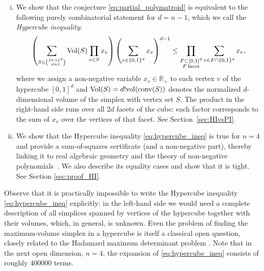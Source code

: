\documentclass[11pt]{amsart}
\newcommand{\KSays}[1] {\textcolor{brilliantrose}{\bfseries #1 } \normalfont}
\newcommand{\conv}{\mathrm{conv}}
\def\vol{{\rm vol}}
\def\Vol{{\rm Vol}}
\theoremstyle{definition}
\theoremstyle{remark}
\begin{document}
\begin{enumerate}[(i)]
   
	\item 
    We show that the conjecture \eqref{eq:partial_polymatroid} is equivalent to the following purely combinatorial statement for $d = n-1$, which we call the \emph{Hypercube inequality}:
\begin{equation}\label{eq:hypercube_ineq}
	\left( 
        \sum_{S \in \binom{\{0,1\}^d}{d+1}} 
            \Vol(S)\prod_{v \in S} x_v
            \right)
        \left( 
        \sum_{v \in \{0,1\}^d} x_v 
    \right)^{d-1}  
    \le 
    \prod_{\substack{F\subset [0,1]^d\\ F\, \text{facet}}} 
    \sum_{v \in F \cap \{0,1\}^d} 
        x_v,
\end{equation}
where we assign a non‑negative variable $x_v \in \mathbb{R}_+$ to each vertex $v$ of
the hypercube $[0,1]^d$ and $\Vol(S)=d!\vol(\conv(S))$ denotes the normalized $d$-dimensional volume of the simplex with vertex set $S$. The product in the right-hand side runs over all $2d$ facets of the cube: each factor corresponds to the sum of $x_v$ over the vertices of that facet. See Section~\ref{sec:HIvsPI}. 

    \item We show that the Hypercube inequality \eqref{eq:hypercube_ineq} is true for $n=4$ and provide a sum-of-squares certificate (and a non-negative part), thereby linking it to real algebraic geometry and the theory of non-negative polynomials~\cite{Re,Ma}. We also describe its equality cases and show that it is tight. See Section \ref{sec:proof_HI}. 
\end{enumerate} 

Observe that it is practically impossible to write the Hypercube inequality \eqref{eq:hypercube_ineq} explicitly: in the left-hand side we would need a complete description of all simplices spanned by vertices of the hypercube together with their volumes, which, in general, is unknown. %
Even the problem of finding the maximum-volume simplex in a hypercube is itself a classical open question, closely related to the Hadamard maximum determinant problem \cite{HKL, NWZ}. Note that in the next open dimension, $n=4$, the expansion of \eqref{eq:hypercube_ineq} consists of roughly $400000$ terms.
\end{document}
